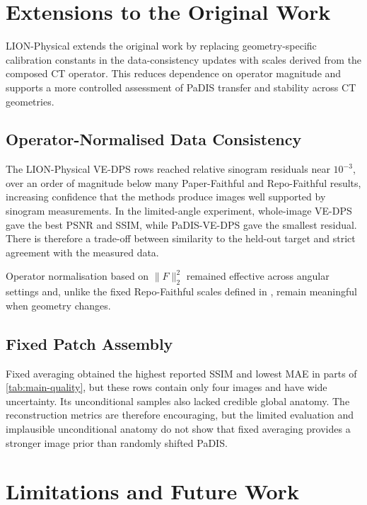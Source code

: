 \section{Extensions to the Original Work}

LION-Physical extends the original work by replacing geometry-specific calibration constants in the data-consistency updates with scales derived from the composed CT operator. This reduces dependence on operator magnitude and supports a more controlled assessment of PaDIS transfer and stability across CT geometries.

\subsection{Operator-Normalised Data Consistency}

The LION-Physical VE-DPS rows reached relative sinogram residuals near $10^{-3}$, over an order of magnitude below many Paper-Faithful and Repo-Faithful results, increasing confidence that the methods produce images well supported by sinogram measurements. In the limited-angle experiment, whole-image VE-DPS gave the best PSNR and SSIM, while PaDIS-VE-DPS gave the smallest residual. There is therefore a trade-off between similarity to the held-out target and strict agreement with the measured data.

Operator normalisation based on $\lVert F\rVert_2^2$ remained effective across angular settings and, unlike the fixed Repo-Faithful scales defined in , remain meaningful when geometry changes.

\subsection{Fixed Patch Assembly}

Fixed averaging obtained the highest reported SSIM and lowest MAE in parts of \autoref{tab:main-quality}, but these rows contain only four images and have wide uncertainty. Its unconditional samples also lacked credible global anatomy. The reconstruction metrics are therefore encouraging, but the limited evaluation and implausible unconditional anatomy do not show that fixed averaging provides a stronger image prior than randomly shifted PaDIS.

\section{Limitations and Future Work}

